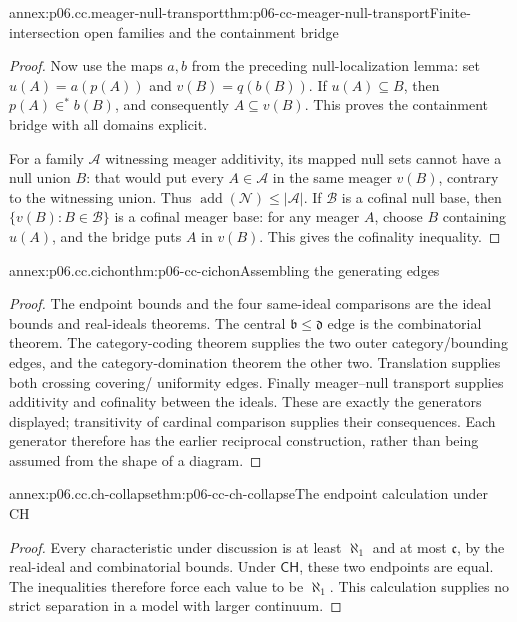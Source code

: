 \begin{annexitem}{annex:p06.cc.meager-null-transport}{thm:p06-cc-meager-null-transport}{Finite-intersection open families and the containment bridge}
\begin{proof}
Now use the maps \(a,b\) from the preceding null-localization lemma:
set \(u(A)=a(p(A))\) and \(v(B)=q(b(B))\). If \(u(A)\subseteq B\),
then \(p(A)\in^*b(B)\), and consequently \(A\subseteq v(B)\).
This proves the containment bridge with all domains explicit.

For a family \(\mathcal A\) witnessing meager additivity, its mapped
null sets cannot have a null union \(B\): that would put every
\(A\in\mathcal A\) in the same meager \(v(B)\), contrary to the
witnessing union. Thus \(\operatorname{add}(\mathcal N)
\leq|\mathcal A|\). If \(\mathcal B\) is a cofinal null base, then
\(\{v(B):B\in\mathcal B\}\) is a cofinal meager base: for any
meager \(A\), choose \(B\) containing \(u(A)\), and the bridge
puts \(A\) in \(v(B)\). This gives the cofinality inequality.
\end{proof}
\end{annexitem}

\begin{annexitem}{annex:p06.cc.cichon}{thm:p06-cc-cichon}{Assembling the generating edges}
\begin{proof}
The endpoint bounds and the four same-ideal comparisons are the ideal
bounds and real-ideals theorems. The central \(\mathfrak b\leq\mathfrak d\)
edge is the combinatorial theorem. The category-coding theorem supplies
the two outer category/bounding edges, and the category-domination
theorem the other two. Translation supplies both crossing covering/
uniformity edges. Finally meager--null transport supplies additivity
and cofinality between the ideals. These are exactly the generators
displayed; transitivity of cardinal comparison supplies their consequences.
Each generator therefore has the earlier reciprocal construction, rather
than being assumed from the shape of a diagram.
\end{proof}
\end{annexitem}

\begin{annexitem}{annex:p06.cc.ch-collapse}{thm:p06-cc-ch-collapse}{The endpoint calculation under CH}
\begin{proof}
Every characteristic under discussion is at least \(\aleph_1\) and
at most \(\mathfrak c\), by the real-ideal and combinatorial bounds.
Under \(\mathsf{CH}\), these two endpoints are equal. The inequalities
therefore force each value to be \(\aleph_1\). This calculation supplies
no strict separation in a model with larger continuum.
\end{proof}
\end{annexitem}
